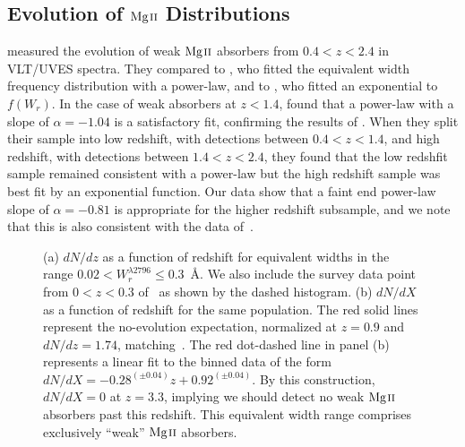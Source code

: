 \documentclass[iop,apj,numberedappendix,appendixfloats,twocolappendix]{emulateapj}
\begin{document}
\subsection{Evolution of ${\hbox{{\rm Mg}\kern 0.1em{\sc ii}}}$ Distributions}

\cite{Narayanan2007} measured the evolution of weak ${\hbox{{\rm Mg}\kern 0.1em{\sc ii}}}$ absorbers from $0.4 < z < 2.4$ in VLT/UVES spectra. They compared to \cite{Churchill1999}, who fitted the equivalent width frequency distribution with a power-law, and to \cite{Nestor2005}, who fitted an exponential to $f(W_r)$. In the case of weak absorbers at $z < 1.4$, \cite{Narayanan2007} found that a power-law with a slope of $\alpha = -1.04$ is a satisfactory fit, confirming the results of \cite{Churchill1999}. When they split their sample into low redshift, with detections between $0.4 < z < 1.4$, and high redshift, with detections between $1.4 < z < 2.4$, they found that the low redshfit sample remained consistent with a power-law but the high redshift sample was best fit by an exponential function. Our data show that a faint end power-law slope of $\alpha = -0.81$ is appropriate for the higher redshift subsample, and we note that this is also consistent with the data of~\cite{Narayanan2007}.

\begin{figure}[bth]
\caption{(a) $dN\!/dz$ as a function of redshift for equivalent widths in the range $0.02 < W_{r}^{\lambda2796} \le 0.3$~{\AA}. We also include the survey data point from $0 < z < 0.3$ of~\cite{Narayanan2005} as shown by the dashed histogram. (b) $dN\!/dX$ as a function of redshift for the same population. The red solid lines represent the no-evolution expectation, normalized at $z = 0.9$ and $dN\!/dz = 1.74$, matching~\cite{Narayanan2007}. The red dot-dashed line in panel (b) represents a linear fit to the binned data of the form $dN\!/dX = -0.28^{(\pm0.04)}z + 0.92^{(\pm0.04)}$. By this construction, $dN\!/dX = 0$ at $z = 3.3$, implying we should detect no weak ${\hbox{{\rm Mg}\kern 0.1em{\sc ii}}}$ absorbers past this redshift. This equivalent width range comprises exclusively ``weak'' ${\hbox{{\rm Mg}\kern 0.1em{\sc ii}}}$ absorbers.}
\label{fig:dndzbetween}
\end{figure}
\end{document}
